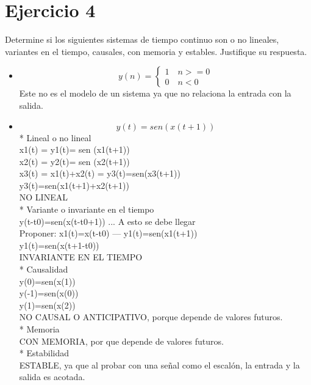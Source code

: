 \documentclass[10pt,a4paper]{report}
\begin{document}
\section{Ejercicio 4}
Determine si los siguientes sistemas de tiempo continuo son o no lineales, variantes en el tiempo, causales, con memoria y estables. Justifique su respuesta.
\begin{itemize}
\item \begin{equation}
 y(n)=
 \left\{
  \begin{aligned}
   1\quad n>=0\\
   0\quad n<0\
  \end{aligned}
 \right.
\label{escunit}
\end{equation}
Este no es el modelo de un sistema ya que no relaciona la entrada con la salida.
\item  \begin{equation*}
y(t)=sen(x(t+1))
\end{equation*}
* Lineal o no lineal\\

   x1(t) = y1(t)= sen (x1(t+1))\\
   x2(t) = y2(t)= sen (x2(t+1))\\
   x3(t) = x1(t)+x2(t) = y3(t)=sen(x3(t+1))\\
                         y3(t)=sen(x1(t+1)+x2(t+1))\\

 NO LINEAL\\

* Variante o invariante en el tiempo\\

  y(t-t0)=sen(x(t-t0+1)) ... A esto se debe llegar\\
  Proponer: x1(t)=x(t-t0) --- y1(t)=sen(x1(t+1))\\
  y1(t)=sen(x(t+1-t0))\\

  INVARIANTE EN EL TIEMPO\\

* Causalidad\\

y(0)=sen(x(1))\\
y(-1)=sen(x(0))\\
y(1)=sen(x(2))\\

NO CAUSAL O ANTICIPATIVO, porque depende de valores futuros. \\

* Memoria\\

CON MEMORIA, por que depende de valores futuros.\\

* Estabilidad\\
ESTABLE, ya que al probar con una señal como el escalón, la entrada y la salida es acotada.\\

\end{itemize}
\end{document}
